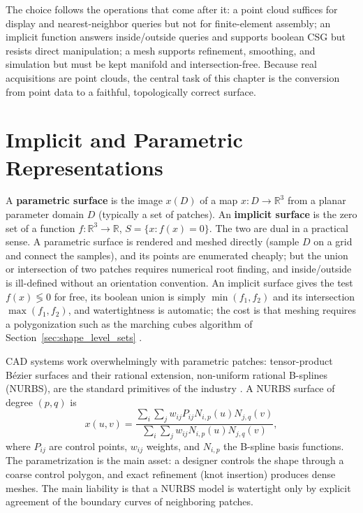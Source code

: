 The choice follows the operations that come after it: a point cloud suffices
for display and nearest-neighbor queries but not for finite-element assembly;
an implicit function answers inside/outside queries and supports boolean CSG
but resists direct manipulation; a mesh supports refinement, smoothing, and
simulation but must be kept manifold and intersection-free. Because real
acquisitions are point clouds, the central task of this chapter is the
conversion from point data to a faithful, topologically correct surface.

\section{Implicit and Parametric Representations}
\label{sec:shape_representation_implicit}

A \textbf{parametric surface} is the image
$x(D)$ of a map $x \colon D \to \mathbb{R}^3$ from a planar parameter domain
$D$ (typically a set of patches). An \textbf{implicit surface} is the zero set of a function $f \colon \mathbb{R}^3 \to \mathbb{R}$,
$S = \{ x : f(x) = 0 \}$. The two are dual in a practical sense. A parametric
surface is rendered and meshed directly (sample $D$ on a grid and connect the
samples), and its points are enumerated cheaply; but the union or intersection
of two patches requires numerical root finding, and inside/outside is
ill-defined without an orientation convention. An implicit surface gives the
test $f(x) \lessgtr 0$ for free, its boolean union is simply
$\min(f_1, f_2)$ and its intersection $\max(f_1, f_2)$, and watertightness is
automatic; the cost is that meshing requires a polygonization such as the
marching cubes algorithm of Section~\ref{sec:shape_level_sets}
\cite{lorensen1987}.

CAD systems work overwhelmingly with parametric patches: tensor-product
B\'ezier surfaces and their rational extension, non-uniform rational B-splines
(NURBS), are the standard primitives of the industry
\cite{farin2002,piegl1997}. A NURBS surface of degree $(p, q)$ is
\[
x(u,v) = \frac{\sum_i \sum_j w_{ij} P_{ij} N_{i,p}(u) N_{j,q}(v)}
                {\sum_i \sum_j w_{ij} N_{i,p}(u) N_{j,q}(v)},
\]
where $P_{ij}$ are control points, $w_{ij}$ weights, and $N_{i,p}$ the
B-spline basis functions. The parametrization is the main asset: a designer
controls the shape through a coarse control polygon, and exact refinement
(knot insertion) produces dense meshes. The main liability is that a NURBS
model is watertight only by explicit agreement of the boundary curves of
neighboring patches.

